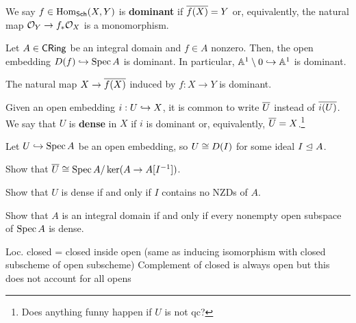 \documentclass[11pt]{article}
\begin{document}
\begin{definition}
We say $f\in\operatorname{Hom}_{\operatorname{\mathsf{Sch}}}(X,Y)$ is \textbf{dominant} if $\overline{f(X)}=Y$ or, equivalently, the natural map $\mathcal{O}_Y\to f_*\mathcal{O}_X$ is a monomorphism.
\end{definition}

\begin{example}
Let $A\in\operatorname{\mathsf{CRing}}$ be an integral domain and $f\in A$ nonzero. Then, the open embedding $D(f)\hookrightarrow\operatorname{Spec} A$ is dominant. In particular, $\mathbb{A}^1\setminus0\hookrightarrow\mathbb{A}^1$ is dominant.
\end{example}

\begin{example}
The natural map $X\to\overline{f(X)}$ induced by $f: X\to Y$ is dominant.
\end{example}

Given an open embedding $i: U\hookrightarrow X$, it is common to write $\overline{U}$ instead of $\overline{i(U)}$. We say that $U$ is \textbf{dense} in $X$ if $i$ is dominant or, equivalently, $\overline{U}=X$.\footnote{Does anything funny happen if $U$ is not qc?}

\begin{exercise}
Let $U\hookrightarrow\operatorname{Spec} A$ be an open embedding, so $U\cong D(I)$ for some ideal $I\trianglelefteq A$.
\begin{enum}{\alph}
\item Show that $\overline{U}\cong\operatorname{Spec} A/\ker(A\to A[I^{-1}])$.

\item Show that $U$ is dense if and only if $I$ contains no NZDs of $A$.

\item Show that $A$ is an integral domain if and only if every nonempty open subspace of $\operatorname{Spec} A$ is dense.
\end{enum}
\end{exercise}

Loc. closed = closed inside open (same as inducing isomorphism with closed subscheme of open subscheme)
Complement of closed is always open but this does not account for all opens
\end{document}
